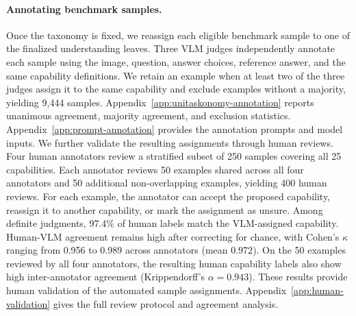 \paragraph{Annotating benchmark samples.}
Once the taxonomy is fixed, we reassign each eligible benchmark sample to one of the finalized understanding leaves.
Three VLM judges independently annotate each sample using the image, question, answer choices, reference answer, and the same capability definitions.
We retain an example when at least two of the three judges assign it to the same capability and exclude examples without a majority, yielding 9,444 samples.
Appendix~\ref{app:unitaskonomy-annotation} reports unanimous agreement, majority agreement, and exclusion statistics.
Appendix~\ref{app:prompt-annotation} provides the annotation prompts and model inputs.
We further validate the resulting assignments through human reviews.
Four human annotators review a stratified subset of 250 samples covering all 25 capabilities.
Each annotator reviews 50 examples shared across all four annotators and 50 additional non-overlapping examples, yielding 400 human reviews.
For each example, the annotator can accept the proposed capability, reassign it to another capability, or mark the assignment as unsure.
Among definite judgments, 97.4\% of human labels match the VLM-assigned capability.
Human-VLM agreement remains high after correcting for chance, with Cohen's $\kappa$ ranging from 0.956 to 0.989 across annotators (mean $0.972$).
On the 50 examples reviewed by all four annotators, the resulting human capability labels also show high inter-annotator agreement (Krippendorff's $\alpha=0.943$).
These results provide human validation of the automated sample assignments.
Appendix~\ref{app:human-validation} gives the full review protocol and agreement analysis.
